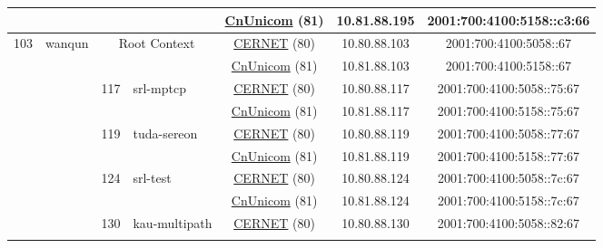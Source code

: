 \begin{small}
\begin{center}
\begin{longtable}{|c|c|c|c|c|c|c|c|}
  &  &  &  & \multicolumn{2}{|c|}{\tiny{\href{http://www.chinaunicom.com}{CnUnicom} (81)}} & \tiny{10.81.88.195} & \tiny{2001:700:4100:5158::c3:66} \\ \hline
 \multirow{32}{*}{\tiny{103}} & \multicolumn{1}{|l|}{\multirow{32}{*}{\tiny{wanqun}}} & \multicolumn{2}{|c|}{\multirow{2}{*}{\tiny{Root Context}}} & \multicolumn{2}{|c|}{\tiny{\href{http://www.cernet.edu.cn}{CERNET} (80)}} & \tiny{10.80.88.103} & \tiny{2001:700:4100:5058::67} \\* \cline{5-5}\cline{6-6}\cline{7-7}\cline{8-8}
  &  & \multicolumn{2}{|c|}{} & \multicolumn{2}{|c|}{\tiny{\href{http://www.chinaunicom.com}{CnUnicom} (81)}} & \tiny{10.81.88.103} & \tiny{2001:700:4100:5158::67} \\* \cline{3-3}\cline{4-4}\cline{5-5}\cline{6-6}\cline{7-7}\cline{8-8}
  &  & \multirow{2}{*}{\tiny{117}} & \multicolumn{1}{|l|}{\multirow{2}{*}{\tiny{srl-mptcp}}} & \multicolumn{2}{|c|}{\tiny{\href{http://www.cernet.edu.cn}{CERNET} (80)}} & \tiny{10.80.88.117} & \tiny{2001:700:4100:5058::75:67} \\* \cline{5-5}\cline{6-6}\cline{7-7}\cline{8-8}
  &  &  &  & \multicolumn{2}{|c|}{\tiny{\href{http://www.chinaunicom.com}{CnUnicom} (81)}} & \tiny{10.81.88.117} & \tiny{2001:700:4100:5158::75:67} \\* \cline{3-3}\cline{4-4}\cline{5-5}\cline{6-6}\cline{7-7}\cline{8-8}
  &  & \multirow{2}{*}{\tiny{119}} & \multicolumn{1}{|l|}{\multirow{2}{*}{\tiny{tuda-sereon}}} & \multicolumn{2}{|c|}{\tiny{\href{http://www.cernet.edu.cn}{CERNET} (80)}} & \tiny{10.80.88.119} & \tiny{2001:700:4100:5058::77:67} \\* \cline{5-5}\cline{6-6}\cline{7-7}\cline{8-8}
  &  &  &  & \multicolumn{2}{|c|}{\tiny{\href{http://www.chinaunicom.com}{CnUnicom} (81)}} & \tiny{10.81.88.119} & \tiny{2001:700:4100:5158::77:67} \\* \cline{3-3}\cline{4-4}\cline{5-5}\cline{6-6}\cline{7-7}\cline{8-8}
  &  & \multirow{2}{*}{\tiny{124}} & \multicolumn{1}{|l|}{\multirow{2}{*}{\tiny{srl-test}}} & \multicolumn{2}{|c|}{\tiny{\href{http://www.cernet.edu.cn}{CERNET} (80)}} & \tiny{10.80.88.124} & \tiny{2001:700:4100:5058::7c:67} \\* \cline{5-5}\cline{6-6}\cline{7-7}\cline{8-8}
  &  &  &  & \multicolumn{2}{|c|}{\tiny{\href{http://www.chinaunicom.com}{CnUnicom} (81)}} & \tiny{10.81.88.124} & \tiny{2001:700:4100:5158::7c:67} \\* \cline{3-3}\cline{4-4}\cline{5-5}\cline{6-6}\cline{7-7}\cline{8-8}
  &  & \multirow{2}{*}{\tiny{130}} & \multicolumn{1}{|l|}{\multirow{2}{*}{\tiny{kau-multipath}}} & \multicolumn{2}{|c|}{\tiny{\href{http://www.cernet.edu.cn}{CERNET} (80)}} & \tiny{10.80.88.130} & \tiny{2001:700:4100:5058::82:67} \\* \cline{5-5}\cline{6-6}\cline{7-7}\cline{8-8}

\end{longtable}
\end{center}
\end{small}
